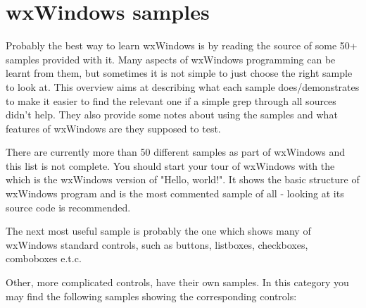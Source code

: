 

\section{wxWindows samples}\label{samples}

Probably the best way to learn wxWindows is by reading the source of some 50+
samples provided with it. Many aspects of wxWindows programming can be learnt
from them, but sometimes it is not simple to just choose the right sample to
look at. This overview aims at describing what each sample does/demonstrates to
make it easier to find the relevant one if a simple grep through all sources
didn't help. They also provide some notes about using the samples and what
features of wxWindows are they supposed to test.

There are currently more than 50 different samples as part of wxWindows and
this list is not complete. You should start your tour of wxWindows with the 
 which is the wxWindows version of
"Hello, world!". It shows the basic structure of wxWindows program and is the
most commented sample of all - looking at its source code is recommended.

The next most useful sample is probably the  
one which shows many of wxWindows standard controls, such as buttons,
listboxes, checkboxes, comboboxes e.t.c.

Other, more complicated controls, have their own samples. In this category you
may find the following samples showing the corresponding controls:

\begin{twocollist}\itemsep=0pt
\end{twocollist}

